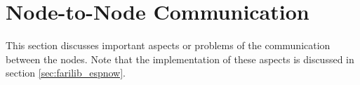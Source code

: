 \section{Node-to-Node Communication}
This section discusses important aspects or problems of the communication between
the nodes. Note that the implementation of these aspects is discussed in section
\ref{sec:farilib_espnow}.


    